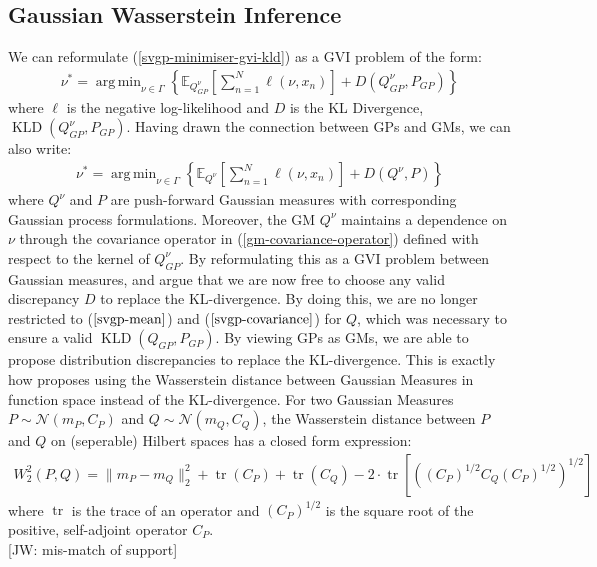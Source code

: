 \documentclass[twoside,11pt]{article}
\newcommand{\jw}[1]{{\color{gray} [JW: #1]}}
\newcommand{\KLD}{\operatorname{KLD}}
\newcommand{\tr}{\operatorname{tr}}
\DeclareMathOperator*{\argmin}{arg\,min}
\begin{document}
\subsection{Gaussian Wasserstein Inference}
We can reformulate (\ref{svgp-minimiser-gvi-kld}) as a GVI problem of the form:
\begin{align}
    \label{svgp-gwi-gp}
    \nu^* = \argmin_{\nu \in \Gamma} \left\{ \mathbb{E}_{Q_{GP}^{\nu}}\left[\sum_{n=1}^N \ell(\nu, x_n)\right] + D(Q_{GP}^{\nu}, P_{GP})\right\}
\end{align}
where $\ell$ is the negative log-likelihood and $D$ is the KL Divergence, $\KLD(Q_{GP}^{\nu}, P_{GP})$. Having drawn the connection between GPs and GMs, we can also write:
\begin{align}
    \label{svgp-gwi-gm}
    \nu^* = \argmin_{\nu \in \Gamma} \left\{ \mathbb{E}_{Q^{\nu}}\left[\sum_{n=1}^N \ell(\nu, x_n)\right] + D(Q^{\nu}, P)\right\}
\end{align}
where $Q^{\nu}$ and $P$ are push-forward Gaussian measures with corresponding Gaussian process formulations. Moreover, the GM $Q^{\nu}$ maintains a dependence on $\nu$ through the covariance operator in (\ref{gm-covariance-operator}) defined with respect to the kernel of $Q_{GP}^{\nu}$. By reformulating this as a GVI problem between Gaussian measures, \cite{wild2022generalized} and \cite{knoblauch2022optimization} argue that we are now free to choose any valid discrepancy $D$ to replace the KL-divergence. By doing this, we are no longer restricted to ($\ref{svgp-mean}$) and ($\ref{svgp-covariance}$) for $Q$, which was necessary to ensure a valid $\KLD(Q_{GP},  P_{GP})$. By viewing GPs as GMs, we are able to propose distribution discrepancies to replace the KL-divergence. This is exactly how \cite{wild2022generalized} proposes using the Wasserstein distance between Gaussian Measures in function space instead of the KL-divergence. For two Gaussian Measures $P \sim \mathcal{N}(m_P, C_P)$ and $Q \sim \mathcal{N}(m_Q, C_Q)$, the Wasserstein distance between $P$ and $Q$ on (seperable) Hilbert spaces has a closed form expression:
\begin{align}
    \label{wasserstein-distance}
    W_2^2(P, Q) = \| m_P - m_Q\|_2^2 + \tr(C_P) + \tr(C_Q) - 2 \cdot \tr \left[ \left( \left(C_P\right)^{1/2} C_Q \left(C_P\right)^{1/2}\right)^{1/2}\right]
\end{align}
where $\tr$ is the trace of an operator and $\left(C_P\right)^{1/2}$ is the square root of the positive, self-adjoint operator $C_P$. 
\\\jw{mis-match of support}
\end{document}

